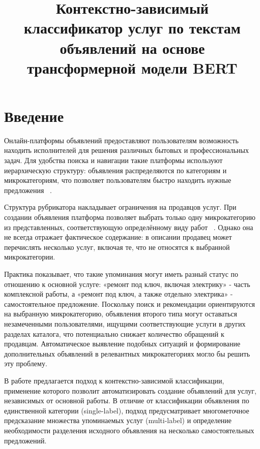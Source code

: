 \documentclass{misisarticle}
\title{Контекстно-зависимый классификатор услуг по текстам объявлений на основе трансформерной модели BERT}
\begin{document}
\maketitle

\section{Введение}

Онлайн-платформы объявлений предоставляют пользователям возможность находить исполнителей для решения различных бытовых и профессиональных задач. Для удобства поиска и навигации такие платформы используют иерархическую структуру: объявления распределяются по категориям и микрокатегориям, что позволяет пользователям быстро находить нужные предложения ~\cite{avitosupp}.

Структура рубрикатора накладывает ограничения на продавцов услуг. При создании объявления платформа позволяет выбрать только одну микрокатегорию из представленных, соответствующую определённому виду работ ~\cite{avitosupp}. Однако она не всегда отражает фактическое содержание: в описании продавец может перечислять несколько услуг, включая те, что не относятся к выбранной микрокатегории.

Практика показывает, что такие упоминания могут иметь разный статус по отношению к основной услуге: «ремонт под ключ, включая электрику» - часть комплексной работы, а «ремонт под ключ, а также отдельно электрика» - самостоятельное предложение. Поскольку поиск и рекомендации ориентируются на выбранную микрокатегорию, объявления второго типа могут оставаться незамеченными пользователями, ищущими соответствующие услуги в других разделах каталога, что потенциально снижает количество обращений к продавцам. Автоматическое выявление подобных ситуаций и формирование дополнительных объявлений в релевантных микрокатегориях могло бы решить эту проблему.

В работе предлагается подход к контекстно-зависимой классификации, применение которого позволит автоматизировать создание объявлений для услуг, независимых от основной работы. В отличие от классификации объявления по единственной категории (single-label), подход предусматривает многометочное предсказание множества упоминаемых услуг (multi-label) и определение необходимости разделения исходного объявления на несколько самостоятельных предложений.
\end{document}
